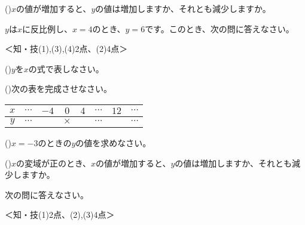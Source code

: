 \documentclass[
  12pt,a4paper,lualatex,ja=standard]{bxjsarticle}
\begin{document}
\begin{flushleft}
()\hspace{2.5pt}$x$の値が増加すると、$y$の値は増加しますか、それとも減少しますか。

\setcounter{skaunta}{0}

\vfill

\noindent{} \hspace{1pt}$y$は$x$に反比例し、$x = 4$のとき、$y = 6$です。このとき、次の問に答えなさい。

%
\begin{flushright}%
\footnotesize{＜知・技(1),(3),(4)2点、(2)4点＞}%
\end{flushright}%


()\hspace{2.5pt}$y$を$x$の式で表しなさい。

()\hspace{2.5pt}次の表を完成させなさい。

\begin{center}
\begin{tabular}{c|ccccccc}
\hline
$x$ & $\cdots$ & $-4$ & $0$ & $4$ & $\cdots$ & $12$ & $\cdots$ \\
\hline
$y$ & $\cdots$ &  & $\times$ &  & $\cdots$ & & $\cdots$ \\
\hline
\end{tabular}
\end{center}

()\hspace{2.5pt}$x = -3$のときの$y$の値を求めなさい。

()\hspace{2.5pt}$x$の変域が正のとき、$x$の値が増加すると、$y$の値は増加しますか、それとも減少しますか。

\vfill

\newpage

\setcounter{skaunta}{0}
\begin{multicols}{2}
\noindent{} \hspace{1pt}次の問に答えなさい。

%
\begin{flushright}%
\footnotesize{＜知・技(1)2点、(2),(3)4点＞}%
\end{flushright}%



\end{multicols}
\end{flushleft}
\end{document}
